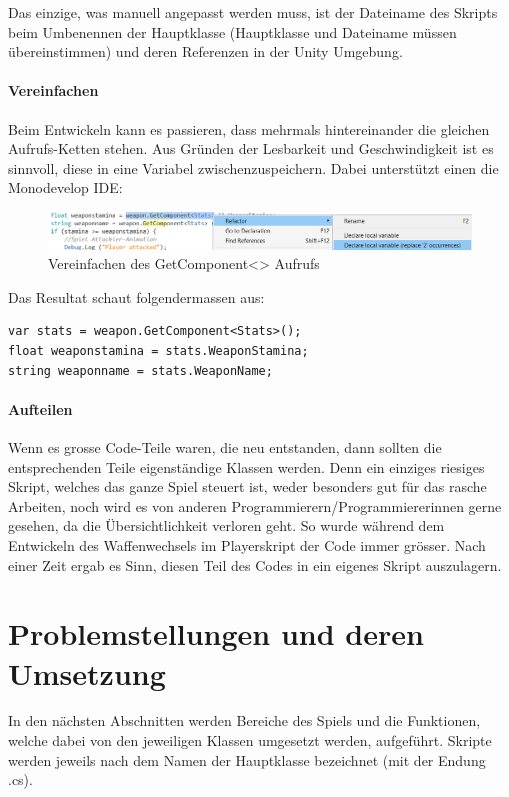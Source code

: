 Das einzige, was manuell angepasst werden muss, ist der Dateiname des Skripts beim Umbenennen der Hauptklasse (Hauptklasse und Dateiname müssen übereinstimmen) und deren Referenzen in der Unity Umgebung.

\paragraph{Vereinfachen}
Beim Entwickeln kann es passieren, dass mehrmals hintereinander die gleichen Aufrufs-Ketten stehen. Aus Gründen der Lesbarkeit und Geschwindigkeit ist es sinnvoll, diese in eine Variabel zwischenzuspeichern. Dabei unterstützt einen die Monodevelop IDE:

\begin{figure}[H]
\includegraphics[scale=0.67]{screenshots/refactor.png}
\caption{Vereinfachen des GetComponent<> Aufrufs}
\end{figure}

Das Resultat schaut folgendermassen aus:

\begin{lstlisting}[caption={Code nach Vereinfachung}]
var stats = weapon.GetComponent<Stats>();
float weaponstamina = stats.WeaponStamina;
string weaponname = stats.WeaponName;
\end{lstlisting}

\paragraph{Aufteilen}
Wenn es grosse Code-Teile waren, die neu entstanden, dann sollten die entsprechenden Teile eigenständige Klassen werden. Denn ein einziges riesiges Skript, welches das ganze Spiel steuert ist, weder besonders gut für das rasche Arbeiten, noch wird es von anderen Programmierern/Programmiererinnen gerne gesehen, da die Übersichtlichkeit verloren geht.
So wurde während dem Entwickeln des Waffenwechsels im Playerskript der Code immer grösser. Nach einer Zeit ergab es Sinn, diesen Teil des Codes in ein eigenes Skript auszulagern.
\section{Problemstellungen und deren Umsetzung}
In den nächsten Abschnitten werden Bereiche des Spiels und die Funktionen, welche dabei von den jeweiligen Klassen umgesetzt werden, aufgeführt. Skripte werden jeweils nach dem Namen der Hauptklasse bezeichnet (mit der Endung .cs).
